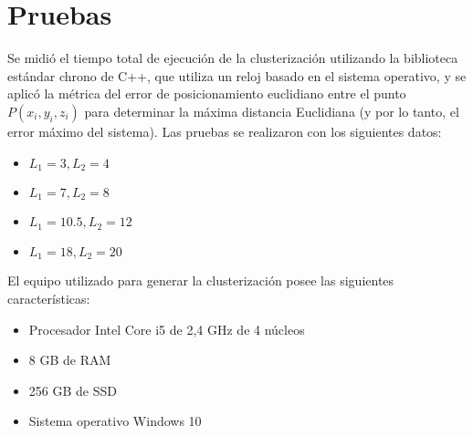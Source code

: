 \section{Pruebas}

Se midió el tiempo total de ejecución de la clusterización utilizando la biblioteca estándar chrono de C++, que utiliza un reloj basado en el sistema operativo, y se aplicó la métrica del error de posicionamiento euclidiano entre el punto $P(x_i, y_i, z_i)$ para determinar la máxima distancia Euclidiana (y por lo tanto, el error máximo del sistema). Las pruebas se realizaron con los siguientes datos:

\begin{itemize}
	\item $L_1 = 3, L_2 = 4$
	\item $L_1 = 7, L_2 = 8$
	\item $L_1 = 10.5, L_2 = 12$
	\item $L_1 = 18, L_2 = 20$
\end{itemize}

El equipo utilizado para generar la clusterización posee las siguientes características:

\begin{itemize}
	\item Procesador Intel Core i5 de 2,4 GHz de 4 núcleos
	\item 8 GB de RAM
	\item 256 GB de SSD
	\item Sistema operativo Windows 10
\end{itemize}

